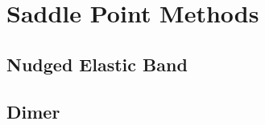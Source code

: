 \section{Saddle Point Methods}
\placeholder
\subsection{Nudged Elastic Band}
\placeholder
\subsection{Dimer}
\placeholder
